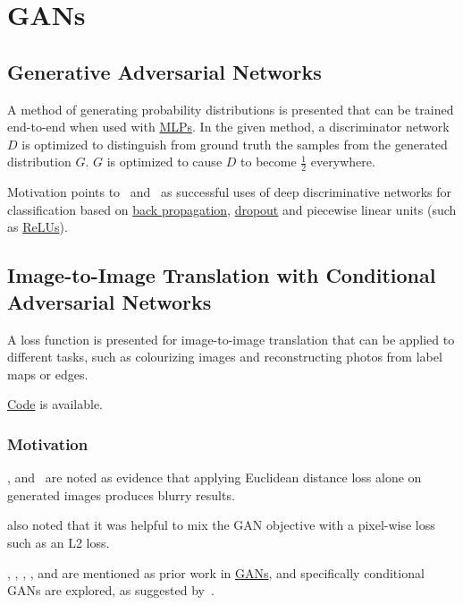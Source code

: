\documentclass[a4paper, 12pt]{article}
\begin{document}
\section{GANs}


\subsection{Generative Adversarial Networks\citet{NIPS2014_5423}}
\label{gan}

A method of generating probability distributions is presented that can be
trained end-to-end when used with \hyperref[multilayer_perceptron]{MLPs}. In
the given method, a discriminator network $D$ is optimized to distinguish from
ground truth the samples from the generated distribution $G$. $G$ is optimized
to cause $D$ to become $\frac{1}{2}$ everywhere.

Motivation points to~\citet{deepSpeechReviewSPM2012} and~\citet{NIPS2012_4824} as
successful uses of deep discriminative networks for classification based on
\hyperref[backprop]{back propagation}, \hyperref[dropout]{dropout} and
piecewise linear units (such as \hyperref[rectified_linear_units]{ReLUs}).


\subsection{Image-to-Image Translation with Conditional Adversarial
            Networks\citet{DBLP:journals/corr/IsolaZZE16}}

A loss function is presented for image-to-image translation that can be applied
to different tasks, such as colourizing images and reconstructing photos from
label maps or edges.

\href{https://github.com/phillipi/pix2pix}{Code} is available.

\subsubsection{Motivation}

\citet{DBLP:journals/corr/LarsenSW15}, \citet{DBLP:journals/corr/PathakKDDE16}
and~\citet{DBLP:journals/corr/ZhangIE16} are noted as evidence that applying
Euclidean distance loss alone on generated images produces blurry results.

\citet{DBLP:journals/corr/PathakKDDE16} also noted that it was helpful to mix
the GAN objective with a pixel-wise loss such as an L2 loss.

\citet{NIPS2014_5423}, \citet{DBLP:journals/corr/DentonCSF15},
\citet{DBLP:journals/corr/RadfordMC15},
\citet{DBLP:journals/corr/SalimansGZCRC16}, and
\citet{DBLP:journals/corr/ZhaoML16} are mentioned as prior work in
\hyperref[gan]{GANs}, and specifically conditional GANs are explored, as
suggested by~\citet{NIPS2014_5423}.
\end{document}
